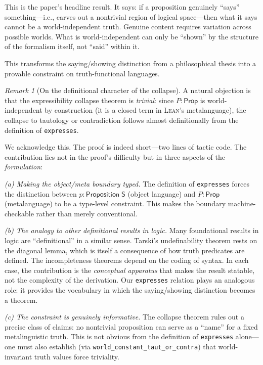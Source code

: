 \documentclass[jsl,bibother]{asl}
\theoremstyle{definition}
\theoremstyle{remark}
\newtheorem{remark}[theorem]{Remark}
\newcommand{\Sach}{\mathsf{S}}
\newcommand{\Prop}{\mathsf{Prop}}
\newcommand{\Lean}{\textsc{Lean}}
\begin{document}
\noindent
This is the paper's headline result.  It says: if a proposition
genuinely ``says'' something---i.e., carves out a nontrivial
region of logical space---then what it says cannot be a
world-independent truth.  Genuine content requires variation
across possible worlds.  What is world-independent can only be
``shown'' by the structure of the formalism itself, not ``said''
within it.

This transforms the saying/showing distinction from a
philosophical thesis into a provable constraint on
truth-functional languages.

\begin{remark}[On the definitional character of the collapse]
\label{rem:triviality}
A natural objection is that the expressibility collapse theorem
is \emph{trivial}: since $P : \Prop$ is world-independent by
construction (it is a closed term in \Lean's metalanguage), the
collapse to tautology or contradiction follows almost
definitionally from the definition of \texttt{expresses}.

We acknowledge this.  The proof is indeed short---two lines of
tactic code.  The contribution lies not in the proof's
difficulty but in three aspects of the \emph{formulation}:

\emph{(a) Making the object/meta boundary typed.}  The
definition of \texttt{expresses} forces the distinction between
$p : \mathsf{Proposition}\;\Sach$ (object language) and
$P : \Prop$ (metalanguage) to be a type-level constraint.  This
makes the boundary machine-checkable rather than merely
conventional.

\emph{(b) The analogy to other definitional results in logic.}
Many foundational results in logic are ``definitional'' in
a similar sense.  Tarski's undefinability theorem rests on the
diagonal lemma, which is itself a consequence of how truth
predicates are defined.  The incompleteness theorems depend on
the coding of syntax.  In each case, the contribution is the
\emph{conceptual apparatus} that makes the result statable, not
the complexity of the derivation.  Our \texttt{expresses}
relation plays an analogous role: it provides the vocabulary in
which the saying/showing distinction becomes a theorem.

\emph{(c) The constraint is genuinely informative.}
The collapse theorem rules out a precise class of claims:
no nontrivial proposition can serve as a ``name'' for a fixed
metalinguistic truth.  This is not obvious from the definition
of \texttt{expresses} alone---one must also establish
(via \texttt{world\_constant\_taut\_or\_contra}) that
world-invariant truth values force triviality.
\end{remark}
\end{document}
